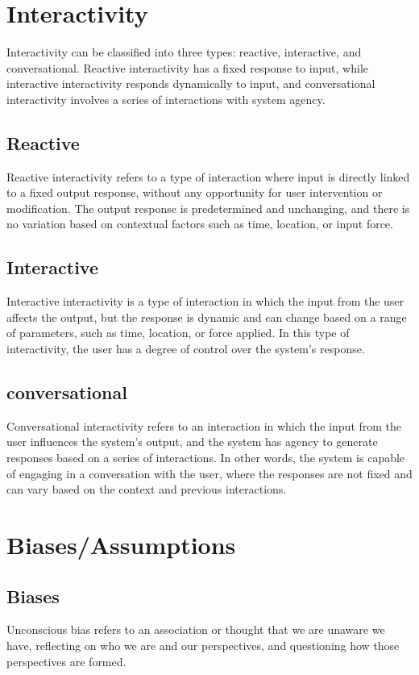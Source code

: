 \documentclass{article}
\begin{document}
\newpage

\section{Interactivity}

Interactivity can be classified into three types: reactive, interactive, and conversational. Reactive interactivity has a fixed response to input, while interactive interactivity responds dynamically to input, and conversational interactivity involves a series of interactions with system agency.

\subsection{Reactive}
Reactive interactivity refers to a type of interaction where input is directly linked to a fixed output response, without any opportunity for user intervention or modification. The output response is predetermined and unchanging, and there is no variation based on contextual factors such as time, location, or input force.
\subsection{Interactive}
Interactive interactivity is a type of interaction in which the input from the user affects the output, but the response is dynamic and can change based on a range of parameters, such as time, location, or force applied. In this type of interactivity, the user has a degree of control over the system's response.
\subsection{conversational}
Conversational interactivity refers to an interaction in which the input from the user influences the system's output, and the system has agency to generate responses based on a series of interactions. In other words, the system is capable of engaging in a conversation with the user, where the responses are not fixed and can vary based on the context and previous interactions.


\section{Biases/Assumptions}

\subsection{Biases}
Unconscious bias refers to an association or thought that we are unaware we have, reflecting on who we are and our perspectives, and questioning how those perspectives are formed.
\end{document}
